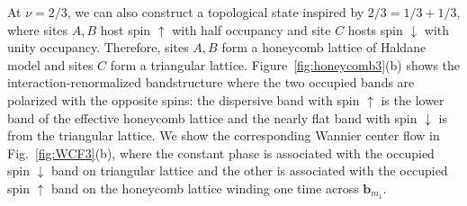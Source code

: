\documentclass[aps,prl,floatfix,twocolumn]{revtex4-1}
\begin{document}
At $ \nu=2/3 $, we can also construct a topological state inspired by $ 2/3=1/3+1/3 $, where sites $ A,B $ host spin $\uparrow$ with half occupancy and site $ C $ hosts spin $\downarrow$ with unity occupancy. Therefore, sites $ A,B $ form a  honeycomb lattice of Haldane model and sites $ C $ form a triangular lattice. Figure~\ref{fig:honeycomb3}(b) shows the interaction-renormalized bandstructure where the two occupied bands are polarized with the opposite spins: the dispersive band with spin $\uparrow$ is the lower band of the effective honeycomb lattice and the nearly flat band with spin $\downarrow$ is from the triangular lattice.  We show the corresponding Wannier center flow in Fig.~\ref{fig:WCF3}(b), where the constant phase is associated with the occupied spin $ \downarrow $ band on triangular lattice and the other is associated with the occupied spin $ \uparrow $ band on the honeycomb lattice winding one time across $ \bm{b}_{m_1} $.
\end{document}
